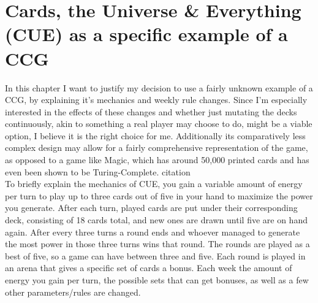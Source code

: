 \section{Cards, the Universe \& Everything (CUE) as a specific example of a CCG}
\label{sec:background:cue}
In this chapter I want to justify my decision to use a fairly unknown example of a CCG, by explaining it’s mechanics and weekly rule changes. Since I’m especially interested in the effects of these changes and whether just mutating the decks continuously, akin to something a real player may choose to do, might be a viable option, I believe it is the right choice for me. Additionally its comparatively less complex design may allow for a fairly comprehensive representation of the game, as opposed to a game like Magic, which has around 50,000 printed cards and has even been shown to be Turing-Complete. citation \\
To briefly explain the mechanics of CUE, you gain a variable amount of energy per turn to play up to three cards out of five in your hand to maximize the power you generate. After each turn, played cards are put under their corresponding deck, consisting of 18 cards total, and new ones are drawn until five are on hand again. After every three turns a round ends and whoever managed to generate the most power in those three turns wins that round. The rounds are played as a best of five, so a game can have between three and five. Each round is played in an arena that gives a specific set of cards a bonus. Each week the amount of energy you gain per turn, the possible sets that can get bonuses, as well as a few other parameters/rules are changed.